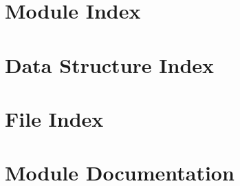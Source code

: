 \let\mypdfximage\pdfximage\def\pdfximage{\immediate\mypdfximage}\documentclass[twoside]{book}
\newcommand{\+}{\discretionary{\mbox{\scriptsize$\hookleftarrow$}}{}{}}
\begin{document}
\chapter{Module Index}

\chapter{Data Structure Index}

\chapter{File Index}

\chapter{Module Documentation}









































\end{document}
